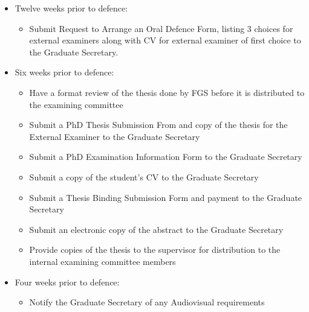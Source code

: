 \documentclass[12pt]{article}
\newcommand{\GS}{Graduate Secretary\xspace}
\begin{document}
\begin{itemize}
    \item Twelve weeks prior to defence:

        \begin{itemize}

            \item Submit Request to Arrange an Oral Defence Form, listing 3
                choices for external examiners along with CV for external
                examiner of first choice to the \GS.

        \end{itemize}

    \item Six weeks prior to defence:

        \begin{itemize}

            \item Have a format review of the thesis done by FGS before it is
                distributed to the examining committee

            \item Submit a PhD Thesis Submission From and copy of the thesis
                for the External Examiner to the \GS 

            \item Submit a PhD Examination Information Form to the Graduate
                Secretary

            \item Submit a copy of the student's CV to the \GS 

            \item Submit a Thesis Binding Submission Form and payment to the
                \GS

            \item Submit an electronic copy of the abstract to the Graduate
                Secretary

            \item Provide copies of the thesis to the supervisor for
                distribution to the internal examining committee members

        \end{itemize}

    \item Four weeks prior to defence:

        \begin{itemize}

            \item Notify the \GS of any Audiovisual requirements


\end{itemize}
\end{itemize}
\end{document}
